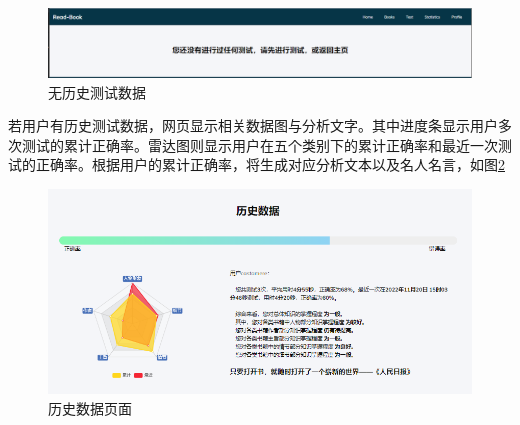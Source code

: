 \documentclass[twoside,11pt]{article}
\begin{document}
\begin{figure}[H]
    \centering
    \includegraphics[width=1\columnwidth]{figures/noTest.png}
    \caption{无历史测试数据}\label{fig:noTest}
\end{figure}

若用户有历史测试数据，网页显示相关数据图与分析文字。其中进度条显示用户多次测试的累计正确率。雷达图则显示用户在五个类别下的累计正确率和最近一次测试的正确率。根据用户的累计正确率，将生成对应分析文本以及名人名言，如图\ref{fig:stat}

\begin{figure}[H]
    \centering
    \includegraphics[width=1\columnwidth]{figures/stat.png}
    \caption{历史数据页面}\label{fig:stat}
\end{figure}

\newpage
\end{document}
